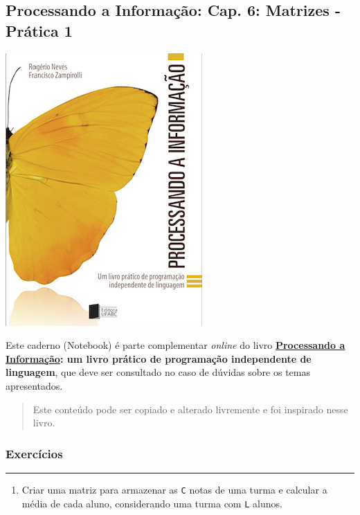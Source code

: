 \documentclass[12pt,a4paper]{article}
\providecommand{\tightlist}{%
      \setlength{\itemsep}{0pt}\setlength{\parskip}{0pt}}
\begin{document}
    \hypertarget{processando-a-informauxe7uxe3o-cap.-6-matrizes---pruxe1tica-1}{%
\subsection{Processando a Informação: Cap. 6: Matrizes - Prática
1}\label{processando-a-informauxe7uxe3o-cap.-6-matrizes---pruxe1tica-1}}

    \includegraphics{"figs/Capa_Processando_Informacao.jpg"}

Este caderno (Notebook) é parte complementar \emph{online} do livro
\textbf{\href{https://editora.ufabc.edu.br/matematica-e-ciencias-da-computacao/58-processando-a-informacao}{Processando
a Informação}: um livro prático de programação independente de
linguagem}, que deve ser consultado no caso de dúvidas sobre os temas
apresentados.

\begin{quote}
Este conteúdo pode ser copiado e alterado livremente e foi inspirado
nesse livro.
\end{quote}

    \hypertarget{exercuxedcios}{%
\subsubsection{Exercícios}\label{exercuxedcios}}

    \begin{center}\rule{0.5\linewidth}{0.5pt}\end{center}

\begin{enumerate}
\def\labelenumi{\arabic{enumi}.}
\tightlist
\item
  Criar uma matriz para armazenar as \texttt{C} notas de uma turma e
  calcular a média de cada aluno, considerando uma turma com \texttt{L}
  alunos.
\end{enumerate}
\end{document}
